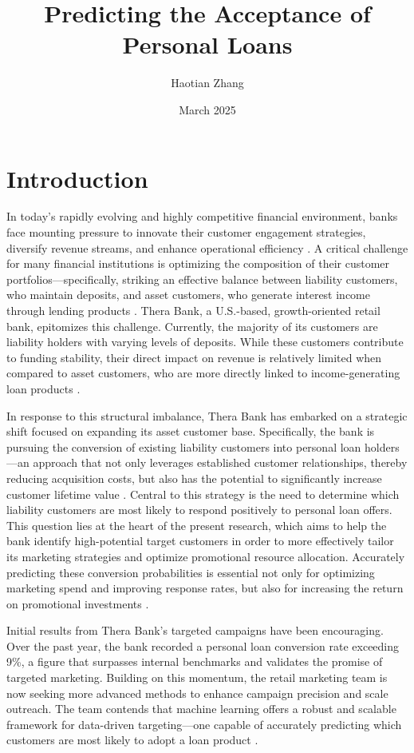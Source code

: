 \documentclass{article}
\title{Predicting the Acceptance of Personal Loans}
\author{Haotian Zhang}
\date{March 2025}
\begin{document}
\doublespacing
\maketitle

\section{Introduction}
In today’s rapidly evolving and highly competitive financial environment, banks face mounting pressure to innovate their customer engagement strategies, diversify revenue streams, and enhance operational efficiency \citep{Krasnikov2009TheIndustry}. A critical challenge for many financial institutions is optimizing the composition of their customer portfolios—specifically, striking an effective balance between liability customers, who maintain deposits, and asset customers, who generate interest income through lending products \citep{Nikiel2002CUSTOMERBANKING}. Thera Bank, a U.S.-based, growth-oriented retail bank, epitomizes this challenge. Currently, the majority of its customers are liability holders with varying levels of deposits. While these customers contribute to funding stability, their direct impact on revenue is relatively limited when compared to asset customers, who are more directly linked to income-generating loan products \citep{Machauer2001SegmentationAttitudes}.

In response to this structural imbalance, Thera Bank has embarked on a strategic shift focused on expanding its asset customer base. Specifically, the bank is pursuing the conversion of existing liability customers into personal loan holders—an approach that not only leverages established customer relationships, thereby reducing acquisition costs, but also has the potential to significantly increase customer lifetime value \citep{Moro2014ATelemarketing}. Central to this strategy is the need to determine which liability customers are most likely to respond positively to personal loan offers. This question lies at the heart of the present research, which aims to help the bank identify high-potential target customers in order to more effectively tailor its marketing strategies and optimize promotional resource allocation. Accurately predicting these conversion probabilities is essential not only for optimizing marketing spend and improving response rates, but also for increasing the return on promotional investments \citep{Fenton2007VisualisingChange:}.

Initial results from Thera Bank’s targeted campaigns have been encouraging. Over the past year, the bank recorded a personal loan conversion rate exceeding 9\%, a figure that surpasses internal benchmarks and validates the promise of targeted marketing. Building on this momentum, the retail marketing team is now seeking more advanced methods to enhance campaign precision and scale outreach. The team contends that machine learning offers a robust and scalable framework for data-driven targeting—one capable of accurately predicting which customers are most likely to adopt a loan product \citep{Alaraj2021ModellingNetworks}.
\end{document}
